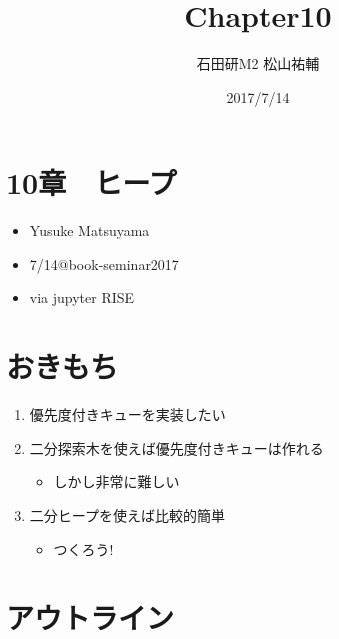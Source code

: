 \documentclass[a4paper,dvipdfmx]{jsarticle}
\title{Chapter10}
\author{石田研M2 松山祐輔}
\date{2017/7/14}
\providecommand{\tightlist}{%
      \setlength{\itemsep}{0pt}\setlength{\parskip}{0pt}}
\begin{document}
    
    
    \maketitle
    
    

    
    \section{10章　ヒープ}\label{ux7ae0ux30d2ux30fcux30d7}

\begin{itemize}
\tightlist
\item
  Yusuke Matsuyama
\item
  7/14@book-seminar2017
\item
  via jupyter RISE
\end{itemize}

    \section{おきもち}\label{ux304aux304dux3082ux3061}

\begin{enumerate}
\def\labelenumi{\arabic{enumi}.}
\tightlist
\item
  優先度付きキューを実装したい
\item
  二分探索木を使えば優先度付きキューは作れる

  \begin{itemize}
  \tightlist
  \item
    しかし非常に難しい
  \end{itemize}
\item
  二分ヒープを使えば比較的簡単

  \begin{itemize}
  \tightlist
  \item
    つくろう!
  \end{itemize}
\end{enumerate}

    \section{アウトライン}\label{ux30a2ux30a6ux30c8ux30e9ux30a4ux30f3}
\end{document}
